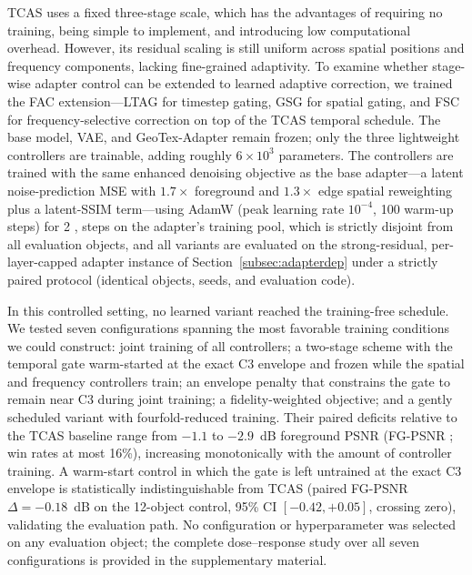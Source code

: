\documentclass[times,twocolumn,final]{elsarticle}
\providecommand{\DIFadd}[1]{{\protect\color{blue} \sf #1}} %
\providecommand{\DIFaddbegin}{} %
\providecommand{\DIFaddend}{} %
\newcommand{\DIFaddincludegraphics}[2][]{{\color{blue}\fbox{\DIFOincludegraphics[#1]{#2}}}} %
\DeclareRobustCommand{\DIFaddbegin}{\DIFOaddbegin \let\includegraphics\DIFaddincludegraphics} %
\DeclareRobustCommand{\DIFaddend}{\DIFOaddend \let\includegraphics\DIFOincludegraphics} %
\begin{document}
TCAS uses a fixed three-stage scale, which has the advantages of requiring no training, being simple to implement, and introducing low computational overhead. However, its residual scaling is still uniform across spatial positions and frequency components, lacking fine-grained adaptivity. To   \DIFaddbegin \DIFadd{examine }\DIFaddend whether stage-wise adapter control can be   \DIFaddbegin \DIFadd{extended to learned adaptive correction, we trained the FAC extension---LTAG }\DIFaddend for timestep gating, GSG for spatial gating, and FSC for frequency-selective correction   \DIFaddbegin \DIFadd{on top of the TCAS temporal schedule. The base model, VAE, and GeoTex-Adapter remain frozen; only the three lightweight controllers are trainable, adding roughly $6\times10^{3}$ parameters. The controllers are trained with the same enhanced denoising objective as the base adapter---a latent noise-prediction MSE with $1.7\times$ foreground and $1.3\times$ edge spatial reweighting plus a latent-SSIM term---using AdamW (peak learning rate $10^{-4}$, 100 warm-up steps) for 2}{\DIFadd{,}}\DIFadd{000 steps on the adapter's training pool, which is strictly disjoint from all evaluation objects, and all variants are evaluated on the strong-residual, per-layer-capped adapter instance of Section~\ref{subsec:adapterdep} under a strictly paired protocol (identical objects, seeds, and evaluation code)}\DIFaddend .

 

 \DIFaddbegin \DIFadd{In this controlled setting, no learned variant reached the training-free schedule. We tested seven configurations spanning the most favorable training conditions we could construct: joint training of all controllers; a two-stage scheme with the temporal gate warm-started at the exact C3 envelope and frozen while the spatial and frequency controllers train; an envelope penalty that constrains the gate to remain near C3 during joint training; a fidelity-weighted objective; and a gently scheduled variant with fourfold-reduced training. Their paired deficits relative to the TCAS baseline range from $-1.1$ to $-2.9$~dB foreground PSNR (}\DIFaddend FG-PSNR  \DIFaddbegin \DIFadd{; win rates at most 16\%), increasing monotonically with the amount of controller training. A warm-start control in which the gate is left untrained at the exact C3 envelope is statistically indistinguishable from TCAS (paired }\DIFaddend FG-PSNR   \DIFaddbegin \DIFadd{$\Delta=-0.18$~dB on the 12-object control, 95\% CI $[-0.42,+0.05]$, crossing zero), validating the evaluation path. No configuration or hyperparameter was selected on any evaluation object; the complete dose--response study over all seven configurations is provided in the supplementary material}\DIFaddend .
\end{document}
